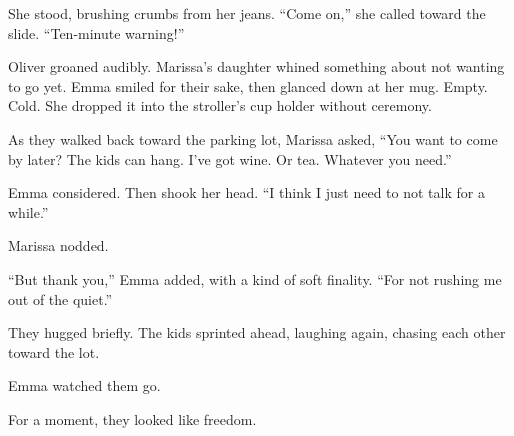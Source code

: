 She stood, brushing crumbs from her jeans. ``Come on,'' she called toward the slide. ``Ten-minute warning!''

Oliver groaned audibly. Marissa’s daughter whined something about not wanting to go yet. Emma smiled for 
their sake, then glanced down at her mug. Empty. Cold. She dropped it into the stroller’s cup holder without ceremony.

As they walked back toward the parking lot, Marissa asked, ``You want to come by later? The kids can hang. 
I’ve got wine. Or tea. Whatever you need.''

Emma considered. Then shook her head. ``I think I just need to not talk for a while.''

Marissa nodded.

``But thank you,'' Emma added, with a kind of soft finality. ``For not rushing me out of the quiet.''

They hugged briefly. The kids sprinted ahead, laughing again, chasing each other toward the lot.

Emma watched them go.

For a moment, they looked like freedom.

